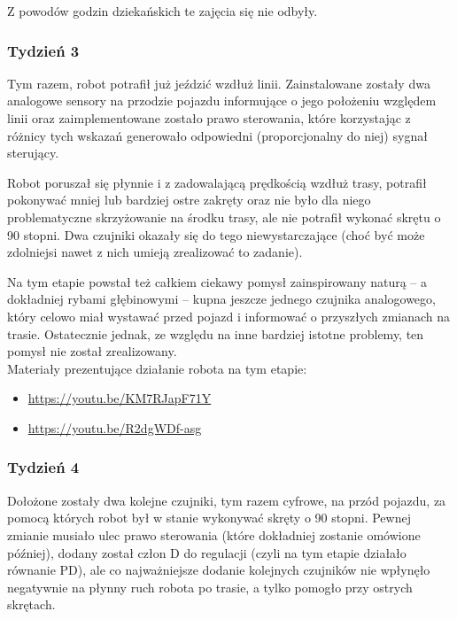 \documentclass[11pt]{article}
\begin{document}
Z powodów godzin dziekańskich te zajęcia się nie odbyły.

\subsubsection*{Tydzień 3}

Tym razem, robot potrafił już jeździć wzdłuż linii. Zainstalowane zostały dwa analogowe sensory na przodzie pojazdu informujące o jego położeniu względem linii oraz zaimplementowane zostało prawo sterowania, które korzystając z różnicy tych wskazań generowało odpowiedni (proporcjonalny do niej) sygnał sterujący.

Robot poruszał się płynnie i z zadowalającą prędkością wzdłuż trasy, potrafił pokonywać mniej lub bardziej ostre zakręty oraz nie było dla niego problematyczne skrzyżowanie na środku trasy, ale nie potrafił wykonać skrętu o 90 stopni. Dwa czujniki okazały się do tego niewystarczające (choć być może zdolniejsi nawet z nich umieją zrealizować to zadanie).

Na tym etapie powstał też całkiem ciekawy pomysł zainspirowany naturą -- a dokładniej rybami głębinowymi -- kupna jeszcze jednego czujnika analogowego, który celowo miał wystawać przed pojazd i informować o przyszłych zmianach na trasie. Ostatecznie jednak, ze względu na inne bardziej istotne problemy, ten pomysł nie został zrealizowany.\\

Materiały prezentujące działanie robota na tym etapie:
\begin{itemize}
\item \href{https://youtu.be/KM7RJapF71Y}{https://youtu.be/KM7RJapF71Y}
\item \href{https://youtu.be/R2dgWDf-asg}{https://youtu.be/R2dgWDf-asg}
\end{itemize}

\subsubsection*{Tydzień 4}

Dołożone zostały dwa kolejne czujniki, tym razem cyfrowe, na przód pojazdu, za pomocą których robot był w stanie wykonywać skręty o 90 stopni. Pewnej zmianie musiało ulec prawo sterowania (które dokładniej zostanie omówione później), dodany został człon D do regulacji (czyli na tym etapie działało równanie PD), ale co najważniejsze dodanie kolejnych czujników nie wpłynęło negatywnie na płynny ruch robota po trasie, a tylko pomogło przy ostrych skrętach.
\end{document}
